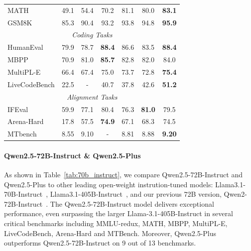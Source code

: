 \begin{table}[tbp]
\begin{tabular}{@{}lcccccc@{}}
MATH & 49.1 & 54.4 & 70.2 & 81.1 & 80.0 & \textbf{83.1} \\

GSM8K & 85.3 & 90.4 & 93.2 & 93.8 & 94.8 & \textbf{95.9} \\

\midrule

\multicolumn{7}{c}{\textit{Coding Tasks}} \\

\midrule

HumanEval & 79.9 & 78.7 & \textbf{88.4} & 86.6 & 83.5 & \textbf{88.4} \\

MBPP & 70.9 & 81.0 & \textbf{85.7} & 82.8 & 82.0 & 84.0 \\

MultiPL-E & 66.4 & 67.4 & 75.0 & 73.7 & 72.8 & \textbf{75.4} \\

LiveCodeBench & 22.5 & - & 40.7 & 37.8 & 42.6 & \textbf{51.2} \\

\midrule

\multicolumn{7}{c}{\textit{Alignment Tasks}} \\

\midrule

IFEval & 59.9 & 77.1 & 80.4 & 76.3 & \textbf{81.0} & 79.5 \\

Arena-Hard & 17.8 & 57.5 & \textbf{74.9} & 67.1 & 68.3 & 74.5 \\


MTbench & 8.55 & 9.10 & - & 8.81 & 8.88 & \textbf{9.20} \\

\bottomrule

\end{tabular}

\end{table}





\paragraph{Qwen2.5-72B-Instruct \& Qwen2.5-Plus} 
As shown in Table~\ref{tab:70b_instruct}, we compare Qwen2.5-72B-Instruct and Qwen2.5-Plus to other leading open-weight instrution-tuned models: Llama3.1-70B-Instruct~\citep{llama3}, Llama3.1-405B-Instruct~\citep{llama3}, and our previous 72B version, Qwen2-72B-Instruct~\citep{qwen2}. 
The Qwen2.5-72B-Instruct model delivers exceptional performance, even surpassing the larger Llama-3.1-405B-Instruct in several critical benchmarks including MMLU-redux, MATH, MBPP, MultiPL-E, LiveCodeBench, Arena-Hard and MTBench.
Moreover, Qwen2.5-Plus outperforms Qwen2.5-72B-Instruct on 9 out of 13 benchmarks.






